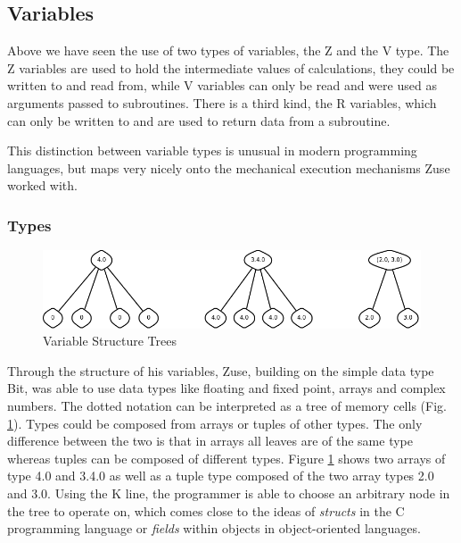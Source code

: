 \documentclass{llncs}
\begin{document}
 \subsection{Variables}
   Above we have seen the use of two types of variables, the Z and the V type. The Z variables are 
   used to hold the intermediate values of calculations, they could be written to and read from, while 
   V variables can only be read and were used as arguments passed to subroutines. There is a third kind, 
   the R variables, which can only be written to and are used to return data from a subroutine.

   This distinction between variable types is unusual in modern programming languages, but maps 
   very nicely onto the mechanical execution mechanisms Zuse worked with.
 \subsubsection{Types}
   \begin{figure}[tb]
     \begin{center}
       \includegraphics[width=\linewidth]{img/trees}
     \end{center}
     \caption{Variable Structure Trees}
     \label{fig:trees}
   \end{figure}
   Through the structure of his variables, Zuse, building on the simple data type Bit, was able
   to use data types like floating and fixed point, arrays and complex numbers\cite{epegmagHorstzuse}. 
   The dotted notation can be interpreted as a tree of memory cells (Fig. \ref{fig:trees}). 
   Types could be composed from arrays or tuples of other types. The only difference between the two 
   is that in arrays all leaves are of the same type whereas tuples can be composed of different 
   types. Figure \ref{fig:trees} shows two arrays of type 4.0 and 3.4.0 as well as a tuple type 
   composed of the two array types 2.0 and 3.0. Using the K line, the programmer is able to choose
   an arbitrary node in the tree to operate on, which comes close to the ideas of \emph{structs} in
   the C programming language or \emph{fields} within objects in object-oriented languages.
\end{document}
